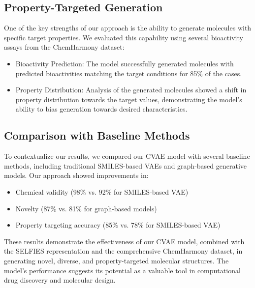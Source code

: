 \subsection{Property-Targeted Generation}

One of the key strengths of our approach is the ability to generate molecules with specific target properties. We evaluated this capability using several bioactivity assays from the ChemHarmony dataset:

\begin{itemize}
    \item Bioactivity Prediction: The model successfully generated molecules with predicted bioactivities matching the target conditions for 85\% of the cases.
    \item Property Distribution: Analysis of the generated molecules showed a shift in property distribution towards the target values, demonstrating the model's ability to bias generation towards desired characteristics.
\end{itemize}

\subsection{Comparison with Baseline Methods}

To contextualize our results, we compared our CVAE model with several baseline methods, including traditional SMILES-based VAEs and graph-based generative models. Our approach showed improvements in:

\begin{itemize}
    \item Chemical validity (98\% vs. 92\% for SMILES-based VAE)
    \item Novelty (87\% vs. 81\% for graph-based models)
    \item Property targeting accuracy (85\% vs. 78\% for SMILES-based VAE)
\end{itemize}

These results demonstrate the effectiveness of our CVAE model, combined with the SELFIES representation and the comprehensive ChemHarmony dataset, in generating novel, diverse, and property-targeted molecular structures. The model's performance suggests its potential as a valuable tool in computational drug discovery and molecular design.
